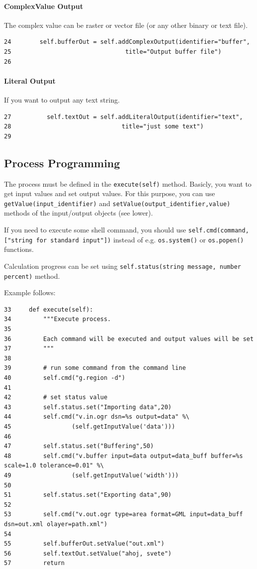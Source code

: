 \documentclass[a4paper,11pt]{article}
\begin{document}
\paragraph{ComplexValue Output}
The complex value can be raster or vector file (or any other binary or text
file).

\begin{verbatim}
24        self.bufferOut = self.addComplexOutput(identifier="buffer",
25                                title="Output buffer file")
26
\end{verbatim}

\paragraph{Literal Output}
If you want to output any text string.
\begin{verbatim}
27          self.textOut = self.addLiteralOutput(identifier="text",
28                               title="just some text")
29
\end{verbatim}

\subsection{Process Programming}
    
The process must be defined in the \texttt{execute(self)} method. 
Basicly, you want to get input values and set output values. For this
purpose, you can use \texttt{getValue(input\_identifier)} and
\texttt{setValue(output\_identifier,value)} methods of the input/output
objects (see lower).

If you need to execute some shell command, you should use
\texttt{self.cmd(command,["string for standard input"])} instead of e.g.
\texttt{os.system()} or \texttt{os.popen()} functions.

Calculation progress can be set using \texttt{self.status(string message,
number percent)} method.

Example follows:

\begin{verbatim}
33     def execute(self):
34         """Execute process.
35         
36         Each command will be executed and output values will be set
37         """
38 
39         # run some command from the command line
40         self.cmd("g.region -d")
41 
42         # set status value
43         self.status.set("Importing data",20)
44         self.cmd("v.in.ogr dsn=%s output=data" %\
45                 (self.getInputValue('data')))
46             
47         self.status.set("Buffering",50)
48         self.cmd("v.buffer input=data output=data_buff buffer=%s scale=1.0 tolerance=0.01" %\
49                 (self.getInputValue('width')))
50 
51         self.status.set("Exporting data",90)
52 
53         self.cmd("v.out.ogr type=area format=GML input=data_buff dsn=out.xml olayer=path.xml")
54         
55         self.bufferOut.setValue("out.xml")
56         self.textOut.setValue("ahoj, svete")
57         return
\end{verbatim}
\end{document}
